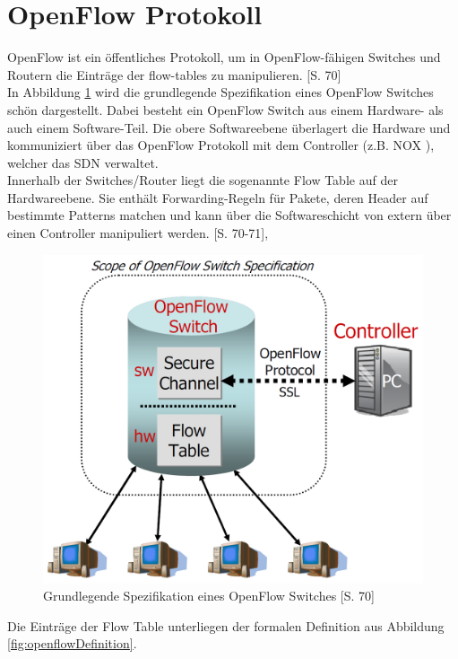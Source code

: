 \documentclass[10pt,conference]{IEEEtran}
\begin{document}
\section{OpenFlow Protokoll}
OpenFlow ist ein öffentliches Protokoll, um in  OpenFlow-fähigen Switches und Routern die Einträge der flow-tables zu manipulieren. \cite{9}[S. 70] \\
In Abbildung \ref{fig:openflowSwitch} wird die grundlegende Spezifikation eines OpenFlow Switches schön dargestellt. Dabei besteht ein OpenFlow Switch aus einem Hardware- als auch einem Software-Teil. Die obere Softwareebene überlagert die Hardware und kommuniziert über das OpenFlow Protokoll mit dem Controller (z.B. NOX \cite{8}), welcher das SDN verwaltet.\\
Innerhalb der Switches/Router liegt die sogenannte Flow Table auf der Hardwareebene. Sie enthält Forwarding-Regeln für Pakete, deren Header auf bestimmte Patterns matchen und kann über die Softwareschicht von extern über einen Controller manipuliert werden. \cite{9}[S. 70-71], \cite{11}
\begin{figure}[h]
	\centering
	\includegraphics[width=\columnwidth]{images/openflowSwitch.PNG}
	\caption{Grundlegende Spezifikation eines OpenFlow Switches \cite{9}[S. 70]}
	\label{fig:openflowSwitch}
\end{figure}
\newline
Die Einträge der Flow Table unterliegen der formalen Definition aus Abbildung \ref{fig:openflowDefinition}. 
\end{document}
